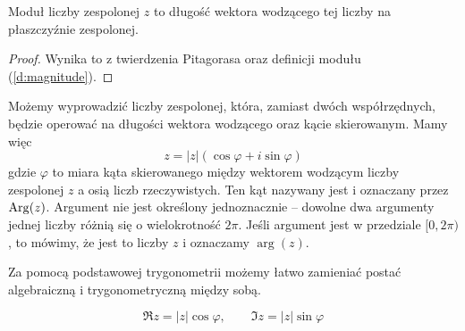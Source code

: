 \documentclass[11pt]{scrartcl}
\begin{document}
    \begin{fact}
        Moduł liczby zespolonej $z$ to długość wektora wodzącego tej liczby na płaszczyźnie zespolonej.
    \end{fact}
    \begin{proof}
        Wynika to z twierdzenia Pitagorasa oraz definicji modułu (\ref{d:magnitude}).
    \end{proof}

    Możemy wyprowadzić  liczby zespolonej, która, zamiast dwóch współrzędnych, będzie operować na długości wektora wodzącego oraz kącie skierowanym. Mamy więc
    $$ z = |z|(\cos\varphi + i\sin\varphi) $$
    gdzie $\varphi$ to miara kąta skierowanego między wektorem wodzącym liczby zespolonej $z$ a osią liczb rzeczywistych. Ten kąt nazywany jest  i oznaczany przez $\operatorname{Arg}(z)$. Argument nie jest określony jednoznacznie -- dowolne dwa argumenty jednej liczby różnią się o wielokrotność $2\pi$. Jeśli argument jest w przedziale $[0, 2\pi)$, to mówimy, że jest to  liczby $z$ i oznaczamy $\arg(z)$.

    Za pomocą podstawowej trygonometrii możemy łatwo zamieniać postać algebraiczną i trygonometryczną między sobą.

    \begin{center}
    \end{center}

    \begin{equation}
        \Re{z} = |z|\cos\varphi, \hspace{2em} \Im{z} = |z|\sin\varphi
    \end{equation}
\end{document}
